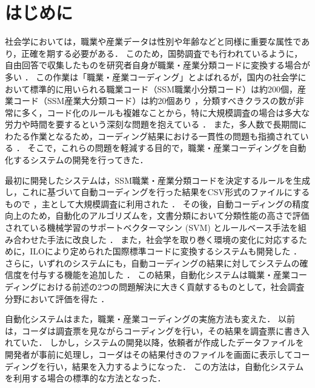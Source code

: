 \documentclass[japanese]{jnlp_1.4}
\begin{document}
\maketitle


\section{はじめに}

社会学においては，職業や産業データは性別や年齢などと同様に重要な属性であり，正確を期する必要がある．
このため，国勢調査でも行われているように，自由回答で収集したものを研究者自身が職業・産業分類コードに変換する場合が多い \cite{Hara84}．
この作業は「職業・産業コーディング」とよばれるが，国内の社会学において標準的に用いられる職業コード（SSM職業小分類コード）は約200個，産業コード（SSM産業大分類コード）は約20個あり \cite{SSM95}，分類すべきクラスの数が非常に多く，コード化のルールも複雑なことから，特に大規模調査の場合は多大な労力や時間を要するという深刻な問題を抱えている \cite{Seiyama04}．
また，多人数で長期間にわたる作業となるため，コーディング結果における一貫性の問題も指摘されている \cite{Todoroki_et_al13}．
そこで，これらの問題を軽減する目的で，職業・産業コーディングを自動化するシステムの開発を行ってきた．

最初に開発したシステムは，SSM職業・産業分類コードを決定するルールを生成し，これに基づいて自動コーディングを行った結果をCSV形式のファイルにするもので \cite{Takahashi00}，主として大規模調査に利用された \cite{Takahashi02b,Takahashi03,Takahashi_et_al05b}．
その後，自動コーディングの精度向上のため，自動化のアルゴリズムを，文書分類において分類性能の高さで評価されている機械学習のサポートベクターマシン (SVM) \cite{Joachims98,Sebastiani02}とルールベース手法を組み合わせた手法に改良した \cite{Takahashi_et_al05a,Takahashi_et_al05c}．
また，社会学を取り巻く環境の変化に対応するために，ILOにより定められた国際標準コードに変換するシステムも開発した \cite{Takahashi08,Takahashi11}．
さらに，いずれのシステムにも，自動コーディングの結果に対してシステムの確信度を付与する機能を追加した \cite{Takahashi_et_al13a}．
この結果，自動化システムは職業・産業コーディングにおける前述の2つの問題解決に大きく貢献するものとして，社会調査分野において評価を得た \cite{Hara13}．

自動化システムはまた，職業・産業コーディングの実施方法も変えた．
以前は，コーダは調査票を見ながらコーディングを行い，その結果を調査票に書き入れていた．
しかし，システムの開発以降，依頼者が作成したデータファイルを開発者が事前に処理し，コーダはその結果付きのファイルを画面に表示してコーディングを行い，結果を入力するようになった．
この方法は，自動化システムを利用する場合の標準的な方法となった．
\end{document}
